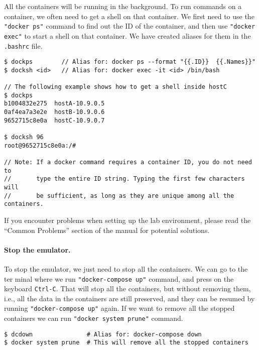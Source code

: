 All the containers will be running in the background. To run
commands on a container, we often need to get a shell on
that container. We first need to use the \texttt{"docker ps"}  
command to find out the ID of the container, and then
use \texttt{"docker exec"} to start a shell on that 
container. We have created aliases for them in
the \texttt{.bashrc} file.

\begin{lstlisting}
$ dockps        // Alias for: docker ps --format "{{.ID}}  {{.Names}}" 
$ docksh <id>   // Alias for: docker exec -it <id> /bin/bash

// The following example shows how to get a shell inside hostC
$ dockps
b1004832e275  hostA-10.9.0.5
0af4ea7a3e2e  hostB-10.9.0.6
9652715c8e0a  hostC-10.9.0.7

$ docksh 96
root@9652715c8e0a:/#  

// Note: If a docker command requires a container ID, you do not need to 
//       type the entire ID string. Typing the first few characters will 
//       be sufficient, as long as they are unique among all the containers. 
\end{lstlisting}





If you encounter problems when setting up the lab environment, 
please read the ``Common Problems'' section of the manual
for potential solutions.


\paragraph{Stop the emulator.} 
To stop the emulator, we just need to stop all the containers. We can go to the ter
minal where we run \texttt{"docker-compose up"} command, and press on the keyboard 
\texttt{Ctrl-C}. That will stop all the containers, but without removing them, i.e., 
all the data in the containers are still preserved, and they can be resumed by 
running \texttt{"docker-compose up"} again. If we want to remove all the stopped
containers we can run \texttt{"docker system prune"} command.

\begin{lstlisting}
$ dcdown               # Alias for: docker-compose down 
$ docker system prune  # This will remove all the stopped containers
\end{lstlisting}



